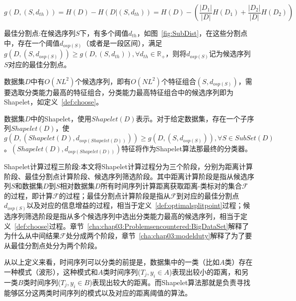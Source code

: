 	\begin{equation}
\label{equ:chap2:Infogain2}
g(D,(S,d_{th})) =H(D)-H(D|(S,d_{th})) = H(D)-(\frac{|D_1|}{|D|}H(D_1)+\frac{|D_2|}{|D|}H(D_2))
\end{equation}	
\begin{definition}
	\label{def:optimalsplitpoint}
	最佳分割点:在候选序列$S$下，有多个阈值$d_{th}$，如图~\ref{fig:SubDist}，在这些分割点中，存在一个阈值$d_{osp(S)}$（或者是一段区间），满足$g(D,(S,d_{osp(S)})) \geq g(D,(S,d_{th})),\forall d_{th}\in \mathbb{R}_{+}$，则将$d_{osp(S)}$记为候选序列$S$对应的最佳分割点。
\end{definition}
数据集$D$中有$O(NL^2)$个候选序列，即有$O(NL^2)$个特征组合$(S,d_{osp(S)})$，需要选取分类能力最高的特征组合，分类能力最高特征组合中的候选序列即为Shapelet，如定义~\ref{def:choose}。
\begin{definition}
	\label{def:choose}
	数据集$D$中的Shapelet，使用$Shapelet(D)$表示。对于给定数据集，存在一个子序列$Shapelet(D)$，使$g(D,(Shapelet(D),d_{osp(Shapelet(D))})) \geq g(D,(S,d_{osp(S)})),\forall S\in SubSet(D)$。$(Shapelet(D),d_{osp(Shapelet(D))})$特征将作为Shapelet算法那最终的分类器。
\end{definition}
\begin{definition}
	\label{def:chap03:Threephases}
	Shapelet计算过程三阶段:本文将Shapelet计算过程分为三个阶段，分别为距离计算阶段、最佳分割点计算阶段、候选序列筛选阶段。其中距离计算阶段是指从候选序列$S$和数据集$D$到$S$相对数据集$D$所有时间序列计算距离获取距离-类标对的集合$\mathcal{F}$的过程，即计算$\mathcal{F}$的过程；最佳分割点计算阶段是指从$\mathcal{F}$到对应的最佳分割点$d_{osp(S)}$以及对应的信息增益的过程，相当于定义~\ref{def:optimalsplitpoint}过程；候选序列筛选阶段是指从多个候选序列中选出分类能力最高的候选序列，相当于定义~\ref{def:choose}过程。章节~\ref{cha:chap03:Problemsencountered:BigDataSet}解释了为什么从中间结果$\mathcal{F}$处分成两个阶段，章节~\ref{cha:chap03:modelduty}解释了为了要从最佳分割点处分为两个阶段。
\end{definition}

从以上定义来看，时间序列可以分类的前提是，数据集中的一类（比如$A$类）存在一种模式（波形），这种模式和$A$类时间序列($T_j,y_i\in A$)表现出较小的距离，和另一类$B$类时间序列($T_j,y_i\in B$)表现出较大的距离。而Shapelet算法那就是负责寻找能够区分这两类时间序列的模式以及对应的距离阈值的算法。%


